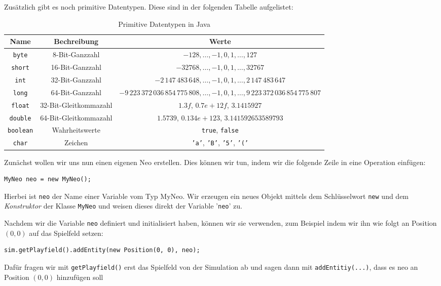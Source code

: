 \begin{questions}
    Zusätzlich gibt es noch primitive Datentypen. Diese sind in der folgenden Tabelle aufgelistet:
    \begin{table}[h!]
        \centering
        \begin{tabular}{c|c|c}
        Name & Bechreibung & Werte \\
        \hline\hline
        \texttt{byte} & 8-Bit-Ganzzahl & \(-128,\dots, -1, 0, 1, \dots, 127\) \\
        \texttt{short} & 16-Bit-Ganzzahl & \(-32768, \dots, -1, 0, 1, \dots, 32767\)\\
        \texttt{int} & 32-Bit-Ganzzahl & \(-2\,147\,483\,648, \dots, -1, 0, 1, \dots ,2\,147\,483\,647\)\\
        \texttt{long} & 64-Bit-Ganzzahl & \(-9\,223\,372\,036\,854\,775\,808, \dots, -1, 0, 1, \dots ,9\,223\,372\,036\,854\,775\,807\)\\
        \hline
        \texttt{float} & 32-Bit-Gleitkommazahl & \(1.3f\), \(0.7e+12f\), \(3.1415927\) \\
        \texttt{double} & 64-Bit-Gleitkommazahl & \(1.5739\), \(0.134e+123\), \(3.141592653589793\) \\
        \hline
        \texttt{boolean} & Wahrheitswerte & \texttt{true}, \texttt{false} \\
        \texttt{char} & Zeichen & \texttt{'a'}, \texttt{'B'}, \texttt{'5'}, \texttt{'('} \\
        \end{tabular}
        \caption{Primitive Datentypen in Java}
        \label{tab:primitive_types}
    \end{table}

    \renewcommand{\workingtimeMinutes}{TODO}
    Zunächst wollen wir uns nun einen eigenen Neo erstellen. Dies können wir tun, indem wir die folgende Zeile in eine Operation einfügen:
    \begin{lstlisting}
MyNeo neo = new MyNeo();
    \end{lstlisting} Hierbei ist \texttt{neo} der Name einer Variable vom Typ MyNeo. Wir erzeugen ein neues Objekt mittels dem Schlüsselwort \lstinline{new} und dem \emph{Konstruktor} der Klasse \texttt{MyNeo} und weisen dieses direkt der Variable '\texttt{neo}' zu.

    Nachdem wir die Variable \lstinline{neo} definiert und initialisiert haben, können wir sie verwenden, zum Beispiel indem wir ihn wie folgt an Position \((0,0)\) auf das Spielfeld setzen:
    \begin{lstlisting}
sim.getPlayfield().addEntity(new Position(0, 0), neo);
    \end{lstlisting}
    Dafür fragen wir mit \texttt{getPlayfield()} erst das Spielfeld von der Simulation ab und sagen dann mit \texttt{addEntitiy(...)}, dass es neo an Position \((0,0)\) hinzufügen soll
    \begin{parts}

\end{parts}
\end{questions}
